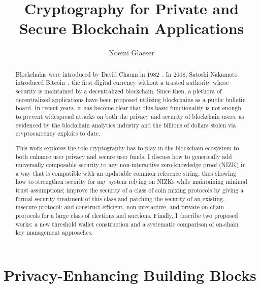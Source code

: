 \documentclass{article}
\title{Cryptography for Private and Secure Blockchain Applications}
\author{Noemi Glaeser}
\date{}
\newcommand{\noemi}[1]{\textcolor{magenta}{Noemi: #1}}
\begin{document}
\maketitle
\begin{abstract}
Blockchains were introduced by David Chaum in 1982~\cite{Chaum82}. In 2008, Satoshi Nakamoto introduced Bitcoin~\cite{bitcoin}, the first digital currency without a trusted authority whose security is maintained by a decentralized blockchain. Since then, a plethora of decentralized applications have been proposed utilizing blockchains as a public bulletin board. In recent years, it has become clear that this basic functionality is not enough to prevent widespread attacks on both the privacy and security of blockchain users, as evidenced by the blockchain analytics industry and the billions of dollars stolen via cryptocurrency exploits to date. 

This work explores the role cryptography has to play in the blockchain ecosystem to both enhance user privacy and secure user funds. I discuss how to generically add universally composable security to any non-interactive zero-knowledge proof (NIZK) in a way that is compatible with an updatable common reference string, thus showing how to strengthen security for any system relying on NIZKs while maintaining minimal trust assumptions; improve the security of a class of coin mixing protocols by giving a formal security treatment of this class and patching the security of an existing, insecure protocol; and construct efficient, non-interactive, and private on-chain protocols for a large class of elections and auctions. Finally, I describe two proposed works: a new threshold wallet construction and a systematic comparison of on-chain key management approaches.

\end{abstract}

\tableofcontents
\newpage



\section{Privacy-Enhancing Building Blocks}\label{sec:building-blocks}
\end{document}
